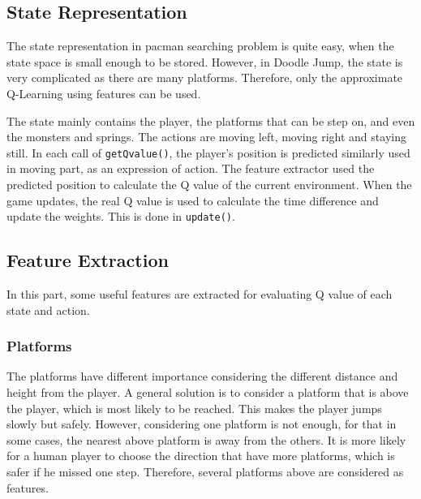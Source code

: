 \documentclass[final]{cvpr}
\begin{document}
\subsection{State Representation}
The state representation in pacman searching problem is quite easy, when the state space is small enough to be stored.
However, in Doodle Jump, the state is very complicated as there are many platforms.
Therefore, only the approximate Q-Learning using features can be used.

The state mainly contains the player, the platforms that can be step on, and even the monsters and springs.
The actions are moving left, moving right and staying still. In each call of \verb|getQvalue()|, 
the player's position is predicted similarly used in moving part, as an expression of action.
The feature extractor used the predicted position to calculate the Q value of the current environment.
When the game updates, the real Q value is used to calculate the time difference and update the weights.
This is done in \verb|update()|.

\subsection{Feature Extraction}
In this part, some useful features are extracted for evaluating Q value of each state and action.

\subsubsection{Platforms}
   The platforms have different importance considering the different distance and height from the player.
   A general solution is to consider a platform that is above the player, which is most likely to be reached.
   This makes the player jumps slowly but safely.
   However, considering one platform is not enough, for that in some cases, the nearest above platform is away from the others.
   It is more likely for a human player to choose the direction that have more platforms, which is safer if he missed one step.
   Therefore, several platforms above are considered as features.
\end{document}
